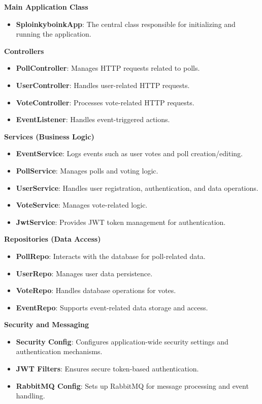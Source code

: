 \noindent \textbf{Main Application Class}
\begin{itemize}
    \item \textbf{SploinkyboinkApp}: The central class responsible for initializing and running the application.
\end{itemize}


\noindent \textbf{Controllers}
\begin{itemize}
    \item \textbf{PollController}: Manages HTTP requests related to polls.
    \item \textbf{UserController}: Handles user-related HTTP requests.
    \item \textbf{VoteController}: Processes vote-related HTTP requests.
    \item \textbf{EventListener}: Handles event-triggered actions.
\end{itemize}

\noindent \textbf{Services (Business Logic)}
\begin{itemize}
    \item \textbf{EventService}: Logs events such as user votes and poll creation/editing.
    \item \textbf{PollService}: Manages polls and voting logic.
    \item \textbf{UserService}: Handles user registration, authentication, and data operations.
    \item \textbf{VoteService}: Manages vote-related logic.
    \item \textbf{JwtService}: Provides JWT token management for authentication.
\end{itemize}

\noindent \textbf{Repositories (Data Access)}
\begin{itemize}
    \item \textbf{PollRepo}: Interacts with the database for poll-related data.
    \item \textbf{UserRepo}: Manages user data persistence.
    \item \textbf{VoteRepo}: Handles database operations for votes.
    \item \textbf{EventRepo}: Supports event-related data storage and access.
\end{itemize}

\noindent \textbf{Security and Messaging}
\begin{itemize}
    \item \textbf{Security Config}: Configures application-wide security settings and authentication mechanisms.
    \item \textbf{JWT Filters}: Ensures secure token-based authentication.
    \item \textbf{RabbitMQ Config}: Sets up RabbitMQ for message processing and event handling.
\end{itemize}

